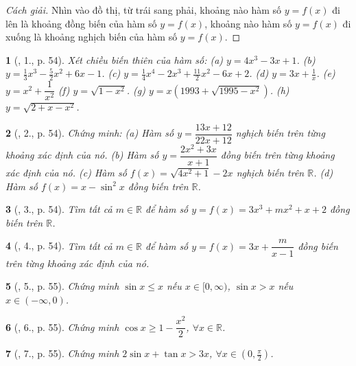 \documentclass{article}
\newtheorem{baitoan}{}
\begin{document}
\begin{proof}[Cách giải]
	Nhìn vào đồ thị, từ trái sang phải, khoảng nào hàm số $y = f(x)$ đi lên là khoảng đồng biến của hàm số $y = f(x)$, khoảng nào hàm số $y = f(x)$ đi xuống là khoảng nghịch biến của hàm số $y = f(x)$.
\end{proof}

\begin{baitoan}[\cite{TLCT_BT_dai_so_giai_tich_11}, 1., p. 54]
	Xét chiều biến thiên của hàm số: (a) $y = 4x^3 - 3x + 1$. (b) $y = \frac{1}{3}x^3 - \frac{5}{2}x^2 + 6x - 1$. (c) $y = \frac{1}{4}x^4 - 2x^3 + \frac{11}{2}x^2 - 6x + 2$. (d) $y = 3x + \frac{1}{x}$. (e) $y = x^2 + \dfrac{1}{x^2}$ (f) $y = \sqrt{1 - x^2}$. (g) $y = x\left(1993 + \sqrt{1995 - x^2}\right)$. (h) $y = \sqrt{2 + x - x^2}$.
\end{baitoan}

\begin{baitoan}[\cite{TLCT_BT_dai_so_giai_tich_11}, 2., p. 54]
	Chứng minh: (a) Hàm số $y = \dfrac{13x + 12}{22x + 12}$ nghịch biến trên từng khoảng xác định của nó. (b) Hàm số $y = \dfrac{2x^2 + 3x}{x + 1}$ đồng biến trên từng khoảng xác định của nó. (c) Hàm số $f(x) = \sqrt{4x^2 + 1} - 2x$ nghịch biến trên $\mathbb{R}$. (d) Hàm số $f(x) = x - \sin^2x$ đồng biến trên $\mathbb{R}$.
\end{baitoan}

\begin{baitoan}[\cite{TLCT_BT_dai_so_giai_tich_11}, 3., p. 54]
	Tìm tất cả $m\in\mathbb{R}$ để hàm số $y = f(x) = 3x^3 + mx^2 + x + 2$ đồng biến trên $\mathbb{R}$.
\end{baitoan}

\begin{baitoan}[\cite{TLCT_BT_dai_so_giai_tich_11}, 4., p. 54]
	Tìm tất cả $m\in\mathbb{R}$ để hàm số $y = f(x) = 3x + \dfrac{m}{x - 1}$ đồng biến trên từng khoảng xác định của nó.
\end{baitoan}

\begin{baitoan}[\cite{TLCT_BT_dai_so_giai_tich_11}, 5., p. 55]
	Chứng minh $\sin x\le x$ nếu $x\in[0,\infty)$, $\sin x > x$ nếu $x\in(-\infty,0)$.
\end{baitoan}

\begin{baitoan}[\cite{TLCT_BT_dai_so_giai_tich_11}, 6., p. 55]
	Chứng minh $\cos x\ge1 - \dfrac{x^2}{2}$, $\forall x\in\mathbb{R}$.
\end{baitoan}

\begin{baitoan}[\cite{TLCT_BT_dai_so_giai_tich_11}, 7., p. 55]
	Chứng minh $2\sin x + \tan x > 3x$, $\forall x\in\left(0,\frac{\pi}{2}\right)$.
\end{baitoan}
\end{document}
